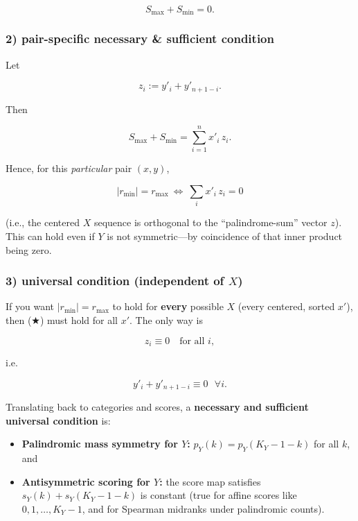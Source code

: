 \documentclass[
  letterpaper,
  DIV=11,
  numbers=noendperiod]{scrartcl}
\theoremstyle{remark}
\begin{document}
\[S_{\max}+S_{\min}=0.\]

\subsubsection{\texorpdfstring{2) \textbf{pair-specific necessary \&
sufficient
condition}}{2) pair-specific necessary \& sufficient condition}}\label{pair-specific-necessary-sufficient-condition}

Let

\[z_i := y'_i + y'_{n+1-i}.\]

Then

\[S_{\max}+S_{\min}=\sum_{i=1}^n x'_i\,z_i.\]

Hence, for this \emph{particular} pair \((x,y)\),

\[\boxed{\ |r_{\min}|=r_{\max}\ \Longleftrightarrow\ \sum_i x'_i\,z_i=0\ } \tag{★}\]

(i.e., the centered \(X\) sequence is orthogonal to the
``palindrome-sum'' vector \(z\)).\\
This can hold even if \(Y\) is not symmetric---by coincidence of that
inner product being zero.

\subsubsection{\texorpdfstring{3) \textbf{universal condition
(independent of
\(X\))}}{3) universal condition (independent of X)}}\label{universal-condition-independent-of-x}

If you want \(|r_{\min}|=r_{\max}\) to hold for \textbf{every} possible
\(X\) (every centered, sorted \(x'\)), then (★) must hold for all
\(x'\). The only way is

\[z_i \equiv 0\quad\text{for all }i,\]

i.e.

\[y'_i + y'_{n+1-i}\equiv 0\ \ \ \forall i.\]

Translating back to categories and scores, a \textbf{necessary and
sufficient universal condition} is:

\begin{itemize}
\item
  \textbf{Palindromic mass symmetry for \(Y\):} \(p_Y(k)=p_Y(K_Y-1-k)\)
  for all \(k\), and
\item
  \textbf{Antisymmetric scoring for \(Y\):} the score map satisfies
  \(s_Y(k)+s_Y(K_Y-1-k)\) is constant (true for affine scores like
  \(0,1,\dots,K_Y-1\), and for Spearman midranks under palindromic
  counts).
\end{itemize}
\end{document}
